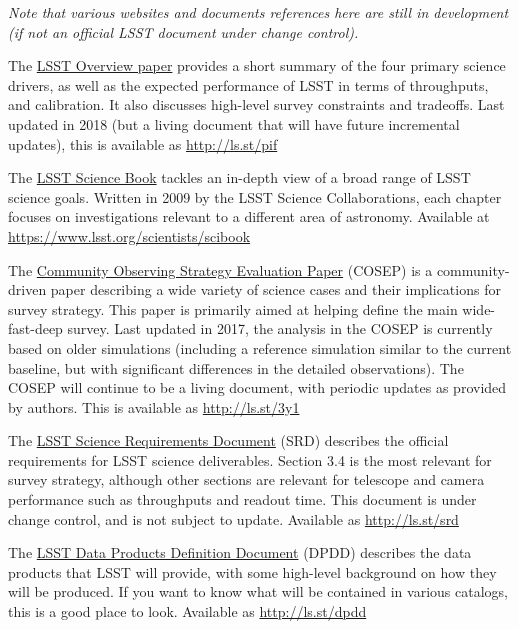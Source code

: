\documentclass[DM,lsstdraft,toc,usenatbib]{lsstdoc}
\begin{document}
{\it Note that various websites and documents references here are still in development (if not an official LSST document under change control).}

The \href{https://www.lsst.org/content/lsst-science-drivers-reference-design-and-anticipated-data-products}{LSST Overview paper} provides a short summary of the four primary science drivers, as well as the expected performance of LSST in terms of throughputs, and calibration. It also discusses high-level survey constraints and tradeoffs.  Last updated in 2018 (but a living document that will have future incremental updates), this is available as \url{http://ls.st/pif}

The \href{https://www.lsst.org/scientists/scibook}{LSST Science Book} tackles an in-depth view of a broad range of LSST science goals. Written in 2009 by the LSST Science Collaborations, each chapter focuses on investigations relevant to a different area of astronomy. Available at \url{https://www.lsst.org/scientists/scibook}

The \href{https://github.com/LSSTScienceCollaborations/ObservingStrategy}{Community Observing Strategy Evaluation Paper} (COSEP) is a community-driven paper describing a wide variety of science cases and their implications for survey strategy. This paper is primarily aimed at helping define the main wide-fast-deep survey. Last updated in 2017, the analysis in the COSEP is currently based on older simulations (including a reference simulation similar to the current baseline, but with significant differences in the detailed observations). The COSEP will continue to be a living document, with periodic updates as provided by authors. This is available as \url{http://ls.st/3y1}

The \href{http:/ls.st/srd}{LSST Science Requirements Document} (SRD) describes the official requirements for LSST science deliverables. Section 3.4 is the most relevant for survey strategy, although other sections are relevant for telescope and camera performance such as throughputs and readout time. This document is under change control, and is not subject to update. Available as \url{http://ls.st/srd}

The \href{http://ls.st/dpdd}{LSST Data Products Definition Document} (DPDD) describes the data products that LSST will provide, with some high-level background on how they will be produced. If you want to know what will be contained in various catalogs, this is a good place to look. Available as \url{http://ls.st/dpdd}
\end{document}
